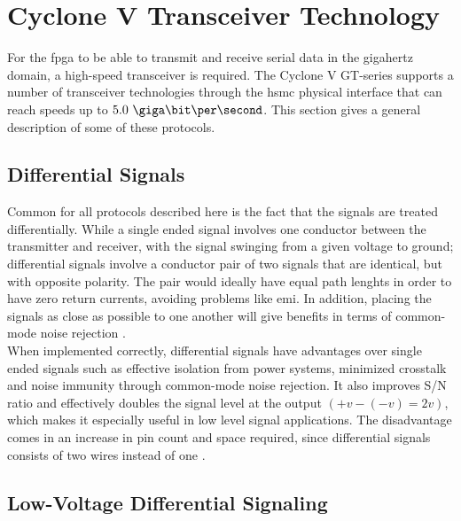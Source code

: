 \documentclass[main.tex]{subfiles}
\begin{document}

\chapter{Cyclone V Transceiver Technology} \label{chap:cycv}

For the \gls{fpga} to be able to transmit and receive serial data in the gigahertz domain, a high-speed transceiver is required. The Cyclone V GT-series supports a number of transceiver technologies through the \gls{hsmc} physical interface that can reach speeds up to $5.0\ \giga\bit\per\second$. This section gives a general description of some of these protocols.

\section{Differential Signals} \label{subsec:diffsig}

Common for all protocols described here is the fact that the signals are treated differentially. While a single ended signal involves one conductor between the transmitter and receiver, with the signal swinging from a given voltage to ground; differential signals involve a conductor pair of two signals that are identical, but with opposite polarity. The pair would ideally have equal path lenghts in order to have zero return currents, avoiding problems like \gls{emi}. In addition, placing the signals as close as possible to one another will give benefits in terms of common-mode noise rejection \cite{douglas01}.\\

When implemented correctly, differential signals have advantages over single ended signals such as effective isolation from power systems, minimized crosstalk and noise immunity through common-mode noise rejection. It also improves S/N ratio and effectively doubles the signal level at the output $(+v - (-v) = 2v)$, which makes it especially useful in low level signal applications. The disadvantage comes in an increase in pin count and space required, since differential signals consists of two wires instead of one \cite{douglas01}.

\section{Low-Voltage Differential Signaling} \label{sec:lvds}
\end{document}
